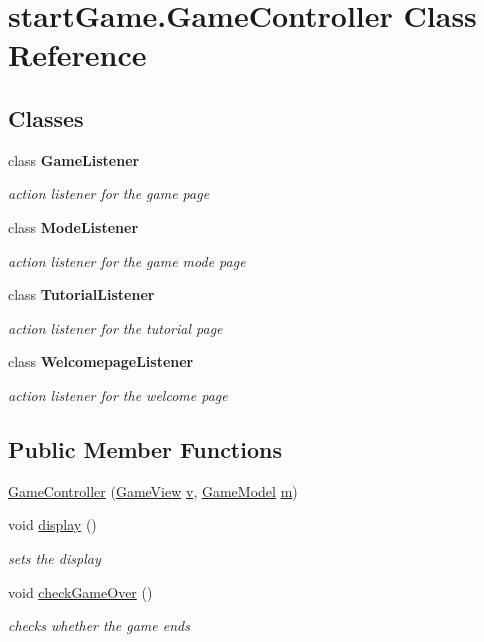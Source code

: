 \hypertarget{classstart_game_1_1_game_controller}{}\section{start\+Game.\+Game\+Controller Class Reference}
\label{classstart_game_1_1_game_controller}
\subsection*{Classes}
\begin{DoxyCompactItemize}
\item 
class {\bfseries Game\+Listener}
\begin{DoxyCompactList}\small\item\em action listener for the game page \end{DoxyCompactList}\item 
class {\bfseries Mode\+Listener}
\begin{DoxyCompactList}\small\item\em action listener for the game mode page \end{DoxyCompactList}\item 
class {\bfseries Tutorial\+Listener}
\begin{DoxyCompactList}\small\item\em action listener for the tutorial page \end{DoxyCompactList}\item 
class {\bfseries Welcomepage\+Listener}
\begin{DoxyCompactList}\small\item\em action listener for the welcome page \end{DoxyCompactList}\end{DoxyCompactItemize}
\subsection*{Public Member Functions}
\begin{DoxyCompactItemize}
\item 
\hyperlink{classstart_game_1_1_game_controller_aecc647e49ed23b571160d7d7c68b04d7}{Game\+Controller} (\hyperlink{classview_1_1_game_view}{Game\+View} \hyperlink{classstart_game_1_1_game_controller_a86e3c6ba6e8d0ecb0946da48fa55e7ee}{v}, \hyperlink{classmodel_1_1_game_model}{Game\+Model} \hyperlink{classstart_game_1_1_game_controller_a2c79234f85f979b8f1efe5a48893560d}{m})
\item 
void \hyperlink{classstart_game_1_1_game_controller_abe07c8d60c3adbb0993e637b8c725884}{display} ()
\begin{DoxyCompactList}\small\item\em sets the display \end{DoxyCompactList}\item 
void \hyperlink{classstart_game_1_1_game_controller_a3e2fb04603f5a7482672b3b5d1afe568}{check\+Game\+Over} ()
\begin{DoxyCompactList}\small\item\em checks whether the game ends \end{DoxyCompactList}\end{DoxyCompactItemize}
